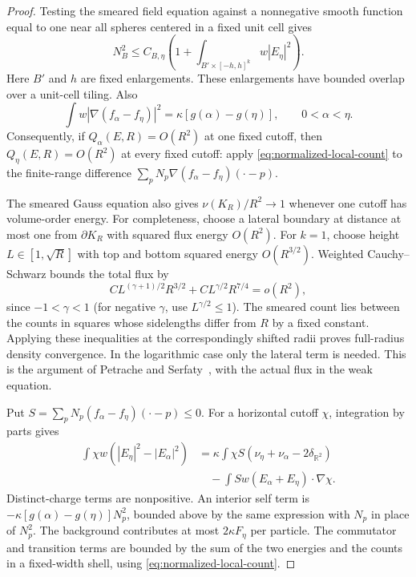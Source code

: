 \begin{proof}
Testing the
smeared field equation against a nonnegative smooth function equal to
one near all spheres centered in a fixed unit cell gives
\begin{equation}
 N_B^2\le C_{B,\eta}\left(1+
          \int_{B'\times[-h,h]^k}w|E_\eta|^2\right).
 \label{eq:normalized-local-count}
\end{equation}
Here $B'$ and $h$ are fixed enlargements.  These enlargements have
bounded overlap over a unit-cell tiling.  Also
\[
 \int w|\nabla(f_\alpha-f_\eta)|^2
       =\kappa[g(\alpha)-g(\eta)],\qquad 0<\alpha<\eta.
\]
Consequently, if $Q_\alpha(E,R)=O(R^2)$ at one fixed cutoff, then
$Q_\eta(E,R)=O(R^2)$ at every fixed cutoff: apply
\eqref{eq:normalized-local-count} to the finite-range difference
$\sum_pN_p\nabla(f_\alpha-f_\eta)(\cdot-p)$.

The smeared Gauss equation also gives
$\nu(K_R)/R^2\to1$ whenever one cutoff has volume-order energy.
For completeness, choose a lateral boundary at distance at most one
from $\partial K_R$ with squared flux energy $O(R^2)$.
For $k=1$, choose height $L\in[1,\sqrt R]$ with top and bottom
squared energy $O(R^{3/2})$.  Weighted Cauchy--Schwarz bounds the
total flux by
\[
 C L^{(\gamma+1)/2}R^{3/2}
       +C L^{\gamma/2}R^{7/4}=o(R^2),
\]
since $-1<\gamma<1$ (for negative $\gamma$, use $L^{\gamma/2}\le1$).
The smeared count lies between the counts in squares whose sidelengths
differ from $R$ by a fixed constant.  Applying these inequalities at
the correspondingly shifted radii proves full-radius density
convergence.  In the logarithmic case only the lateral term is needed.
This is the argument of Petrache and Serfaty~\citep[Lemma~2.1]{PetracheSerfaty2017}, with
the actual flux in the weak equation.

Put $S=\sum_pN_p(f_\alpha-f_\eta)(\cdot-p)\le0$.
For a horizontal cutoff $\chi$, integration by parts gives
\begin{align*}
 \int\chi w(|E_\eta|^2-|E_\alpha|^2)
  &=\kappa\int\chi S(\nu_\eta+\nu_\alpha-2\delta_{\mathbb R^2})\\
  &\quad-\int S w(E_\alpha+E_\eta)\cdot\nabla\chi.
\end{align*}
Distinct-charge terms are nonpositive.  An interior self term is
$-\kappa[g(\alpha)-g(\eta)]N_p^2$, bounded above by the same
expression with $N_p$ in place of $N_p^2$.  The background contributes
at most $2\kappa F_\eta$ per particle.  The commutator and transition
terms are bounded by the sum of the two energies and the counts in a
fixed-width shell, using \eqref{eq:normalized-local-count}.


\end{proof}
